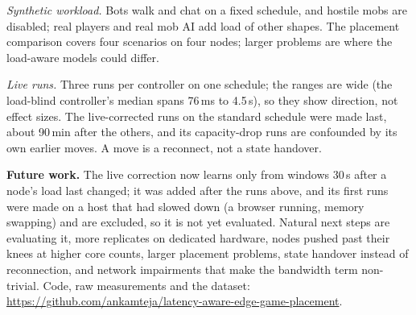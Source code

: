 \documentclass[conference]{IEEEtran}
\begin{document}
\emph{Synthetic workload.} Bots walk and chat on a fixed schedule, and
hostile mobs are disabled; real players and real mob AI add load of other
shapes. The placement comparison covers four scenarios on four nodes; larger
problems are where the load-aware models could differ.

\emph{Live runs.} Three runs per controller on one schedule; the ranges are
wide (the load-blind controller's median spans 76\,ms to 4.5\,s), so they
show direction, not effect sizes. The live-corrected runs on the standard
schedule were made last, about 90\,min after the others, and its
capacity-drop runs are confounded by its own earlier moves. A move is a reconnect, not a state handover.

\textbf{Future work.} The live correction now learns only from windows
30\,s after a node's load last changed; it was added after the runs above,
and its first runs were made on a host that had slowed down (a browser
running, memory swapping) and are excluded, so it is not yet evaluated.
Natural next steps are evaluating it, more replicates on dedicated
hardware, nodes pushed past their knees at higher core counts, larger
placement problems, state handover instead of reconnection, and network
impairments that make the bandwidth term
non-trivial. Code, raw measurements and the dataset:
\url{https://github.com/ankamteja/latency-aware-edge-game-placement}.



\end{document}
